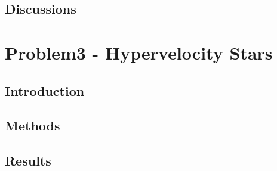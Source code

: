 \documentclass[a4paper]{article}
\begin{document}

		\subsection{Discussions} \label{2:discussions}



	\section{Problem3 - Hypervelocity Stars} \label{Problem3}
	

		\subsection{Introduction} \label{3:introduction}


		\subsection{Methods} \label{3:methods}
		
		
		


		\subsection{Results} \label{3:results}
		
\end{document}
